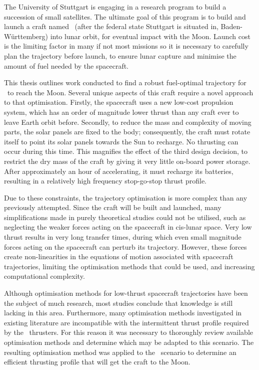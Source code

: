 
\vfill

The University of Stuttgart is engaging in a research program to build a succession of small satellites. The ultimate goal of this program is to build and launch a craft named \BW\ (after the federal state Stuttgart is situated in, Baden-W\"{u}rttemberg) into lunar orbit, for eventual impact with the Moon. Launch cost is the limiting factor in many if not most missions so it is necessary to carefully plan the trajectory before launch, to ensure lunar capture and minimise the amount of fuel needed by the spacecraft.

This thesis outlines work conducted to find a robust fuel-optimal trajectory for \BW\ to reach the Moon. Several unique aspects of this craft require a novel approach to that optimisation. Firstly, the spacecraft uses a new low-cost propulsion system, which has an order of magnitude lower thrust than any craft ever to leave Earth orbit before. Secondly, to reduce the mass and complexity of moving parts, the solar panels are fixed to the body; consequently, the craft must rotate itself to point its solar panels towards the Sun to recharge. No thrusting can occur during this time. This magnifies the effect of the third design decision, to restrict the dry mass of the craft by giving it very little on-board power storage. After approximately an hour of accelerating, it must recharge its batteries, resulting in a relatively high frequency stop-go-stop thrust profile.

Due to these constraints, the trajectory optimisation is more complex than any previously attempted. Since the craft will be built and launched, many simplifications made in purely theoretical studies could not be utilised, such as neglecting the weaker forces acting on the spacecraft in cis-lunar space. Very low thrust results in very long transfer times, during which even small magnitude forces acting on the spacecraft can perturb its trajectory. However, these forces create non-linearities in the equations of motion associated with spacecraft trajectories, limiting the optimisation methods that could be used, and increasing computational complexity.

Although optimisation methods for low-thrust spacecraft trajectories have been the subject of much research, most studies conclude that knowledge is still lacking in this area. Furthermore, many optimisation methods investigated in existing literature are incompatible with the intermittent thrust profile required by the \BW\ thrusters. For this reason it was necessary to thoroughly review available optimisation methods and determine which may be adapted to this scenario. The resulting optimisation method was applied to the \BW\ scenario to determine an efficient thrusting profile that will get the craft to the Moon.

